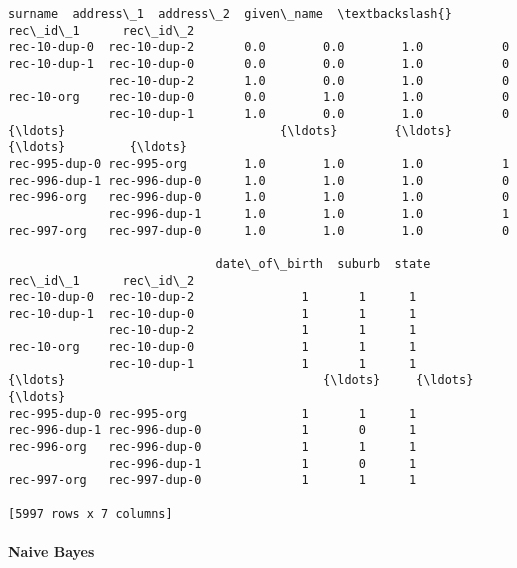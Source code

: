 \documentclass{article}
\begin{document}
\begin{Verbatim}[commandchars=\\\{\}]
                             surname  address\_1  address\_2  given\_name  \textbackslash{}
rec\_id\_1      rec\_id\_2                                                   
rec-10-dup-0  rec-10-dup-2       0.0        0.0        1.0           0   
rec-10-dup-1  rec-10-dup-0       0.0        0.0        1.0           0   
              rec-10-dup-2       1.0        0.0        1.0           0   
rec-10-org    rec-10-dup-0       0.0        1.0        1.0           0   
              rec-10-dup-1       1.0        0.0        1.0           0   
{\ldots}                              {\ldots}        {\ldots}        {\ldots}         {\ldots}   
rec-995-dup-0 rec-995-org        1.0        1.0        1.0           1   
rec-996-dup-1 rec-996-dup-0      1.0        1.0        1.0           0   
rec-996-org   rec-996-dup-0      1.0        1.0        1.0           0   
              rec-996-dup-1      1.0        1.0        1.0           1   
rec-997-org   rec-997-dup-0      1.0        1.0        1.0           0   

                             date\_of\_birth  suburb  state  
rec\_id\_1      rec\_id\_2                                     
rec-10-dup-0  rec-10-dup-2               1       1      1  
rec-10-dup-1  rec-10-dup-0               1       1      1  
              rec-10-dup-2               1       1      1  
rec-10-org    rec-10-dup-0               1       1      1  
              rec-10-dup-1               1       1      1  
{\ldots}                                    {\ldots}     {\ldots}    {\ldots}  
rec-995-dup-0 rec-995-org                1       1      1  
rec-996-dup-1 rec-996-dup-0              1       0      1  
rec-996-org   rec-996-dup-0              1       1      1  
              rec-996-dup-1              1       0      1  
rec-997-org   rec-997-dup-0              1       1      1  

[5997 rows x 7 columns]
\end{Verbatim}
    \hypertarget{naive-bayes}{%
\paragraph{Naive Bayes}\label{naive-bayes}}

    \begin{Verbatim}[commandchars=\\\{\}]

\end{Verbatim}
\end{document}

